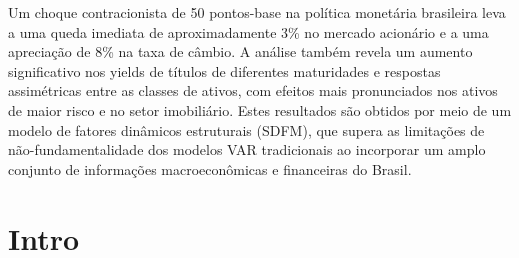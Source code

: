 \documentclass[
article,			%
12pt,				%
oneside,			%
a4paper,			%
hidelinks, 
english,			%
brazil,				%
]{abntex2}
\theoremstyle{plain}
\theoremstyle{definition}
\theoremstyle{remark}
\begin{document}
\frenchspacing 


%
%
\maketitle

\renewcommand{\resumoname}{Resumo}
\begin{resumoumacoluna}
    Um choque contracionista de 50 pontos-base na política monetária brasileira leva a uma queda imediata de aproximadamente 3\% no mercado acionário e a uma apreciação de 8\% na taxa de câmbio. A análise também revela um aumento significativo nos yields de títulos de diferentes maturidades e respostas assimétricas entre as classes de ativos, com efeitos mais pronunciados nos ativos de maior risco e no setor imobiliário. Estes resultados são obtidos por meio de um modelo de fatores dinâmicos estruturais (SDFM), que supera as limitações de não-fundamentalidade dos modelos VAR tradicionais ao incorporar um amplo conjunto de informações macroeconômicas e financeiras do Brasil.
\vspace{\onelineskip} 
\end{resumoumacoluna}


\textual

\section{Intro}
\end{document}
